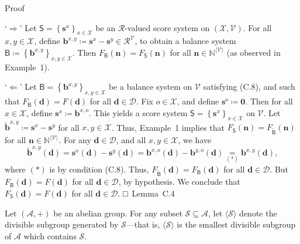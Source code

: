 \documentclass[
]{article}
\begin{document}
Proof

`\(\Longrightarrow\)' Let
\(\mathsf{S} = \left\{ \mathbf{s}^{x} \right\}_{x \in \mathcal{X}}\) be
an \(\mathcal{R}\)-valued score system on
\(\left( \mathcal{X},\mathcal{V} \right)\). For all
\(x,y \in \mathcal{X}\), define
\(\mathbf{b}^{x,y} ≔ \mathbf{s}^{x} - \mathbf{s}^{y} \in \mathcal{R}^{\mathcal{V}}\),
to obtain a balance system
\(\mathsf{B} ≔ \left\{ \mathbf{b}^{x,y} \right\}_{x,y \in \mathcal{X}}\).
Then
\(F_{\mathsf{B}}\left( \mathbf{n} \right) = F_{\mathsf{S}}\left( \mathbf{n} \right)\)
for all \(\mathbf{n} \in \mathbb{N}^{\langle\mathcal{V}\rangle}\) (as
observed in Example~1).

`\(\Longleftarrow\)' Let
\(\mathsf{B} = \left\{ \mathbf{b}^{x,y} \right\}_{x,y \in \mathcal{X}}\)
be a balance system on \(\mathcal{V}\) satisfying (C.8), and such that
\(F_{\mathsf{B}}\left( \mathbf{d} \right) = F\left( \mathbf{d} \right)\)
for all \(\mathbf{d} \in \mathcal{D}\). Fix \(o \in \mathcal{X}\), and
define \(\mathbf{s}^{o} ≔ \mathbf{0}\). Then for all
\(x \in \mathcal{X}\), define \(\mathbf{s}^{x} ≔ \mathbf{b}^{x,o}\).
This yields a score system
\(\mathsf{S} = \left\{ \mathbf{s}^{x} \right\}_{x \in \mathcal{X}}\) on
\(\mathcal{V}\). Let
\({\widetilde{\mathbf{b}}}^{x,y} ≔ \mathbf{s}^{x} - \mathbf{s}^{y}\) for
all \(x,y \in \mathcal{X}\). Thus, Example~1 implies that
\(F_{\mathsf{S}}\left( \mathbf{n} \right) = F_{\widetilde{\mathsf{B}}}\left( \mathbf{n} \right)\)
for all \(\mathbf{n} \in \mathbb{N}^{\langle\mathcal{V}\rangle}\). For
any \(\mathbf{d} \in \mathcal{D}\), and all \(x,y \in \mathcal{X}\), we
have
\[{\widetilde{\mathbf{b}}}^{x,y}\left( \mathbf{d} \right) = \mathbf{s}^{x}\left( \mathbf{d} \right) - \mathbf{s}^{y}\left( \mathbf{d} \right) = \mathbf{b}^{x,o}\left( \mathbf{d} \right) - \mathbf{b}^{y,o}\left( \mathbf{d} \right)\underset{( \ast )}{=}\mathbf{b}^{x,y}\left( \mathbf{d} \right)\text{,}\]
where \(( \ast )\) is by condition (C.8). Thus,
\(F_{\widetilde{\mathsf{B}}}\left( \mathbf{d} \right) = F_{\mathsf{B}}\left( \mathbf{d} \right)\)
for all \(\mathbf{d} \in \mathcal{D}\). But
\(F_{\mathsf{B}}\left( \mathbf{d} \right) = F\left( \mathbf{d} \right)\)
for all \(\mathbf{d} \in \mathcal{D}\), by hypothesis. We conclude that
\(F_{\mathsf{S}}\left( \mathbf{d} \right) = F\left( \mathbf{d} \right)\)
for all \(\mathbf{d} \in \mathcal{D}\). □~Lemma~C.4

Let \(\left( \mathcal{A}, + \right)\) be an abelian group. For any
subset \(\mathcal{S} \subseteq \mathcal{A}\), let
\(\langle\mathcal{S}\rangle\) denote the divisible subgroup generated by
\(\mathcal{S}\)---that is, \(\langle\mathcal{S}\rangle\) is the smallest
divisible subgroup of \(\mathcal{A}\) which contains \(\mathcal{S}\).
\end{document}
